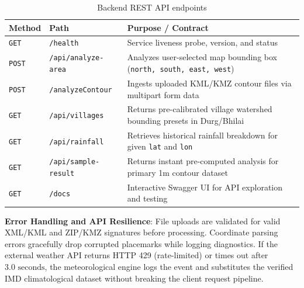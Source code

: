 \documentclass[manuscript,screen,nonacm]{acmart}
\begin{document}
\begin{table}[h]
  \caption{Backend REST API endpoints}
  \label{tab:endpoints}
  \begin{tabular}{lll}
    \toprule
    Method & Path & Purpose / Contract \\
    \midrule
    \texttt{GET} & \texttt{/health} & Service liveness probe, version, and status \\
    \texttt{POST} & \texttt{/api/analyze-area} & Analyzes user-selected map bounding box (\texttt{north, south, east, west}) \\
    \texttt{POST} & \texttt{/analyzeContour} & Ingests uploaded KML/KMZ contour files via multipart form data \\
    \texttt{GET} & \texttt{/api/villages} & Returns pre-calibrated village watershed bounding presets in Durg/Bhilai \\
    \texttt{GET} & \texttt{/api/rainfall} & Retrieves historical rainfall breakdown for given \texttt{lat} and \texttt{lon} \\
    \texttt{GET} & \texttt{/api/sample-result} & Returns instant pre-computed analysis for primary 1m contour dataset \\
    \texttt{GET} & \texttt{/docs} & Interactive Swagger UI for API exploration and testing \\
    \bottomrule
  \end{tabular}
\end{table}

\noindent \textbf{Error Handling and API Resilience}: File uploads are validated for valid XML/KML and ZIP/KMZ signatures before processing. Coordinate parsing errors gracefully drop corrupted placemarks while logging diagnostics. If the external weather API returns HTTP 429 (rate-limited) or times out after $3.0\text{ seconds}$, the meteorological engine logs the event and substitutes the verified IMD climatological dataset without breaking the client request pipeline.
\end{document}
